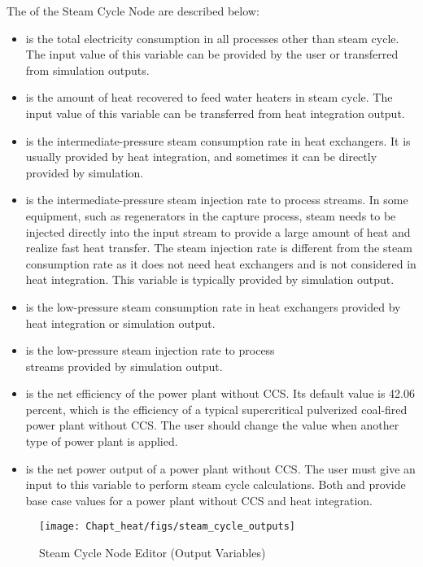 The  of the Steam Cycle Node are described below:
\begin{itemize}
	\item {} is the total electricity consumption in all processes other than steam cycle. The input value of this variable can be provided by the user or transferred from simulation outputs.
	\item {} is the amount of heat recovered to feed water heaters in steam cycle. The input value of this variable can be transferred from heat integration output.
	\item {} is the intermediate-pressure steam consumption rate in heat exchangers. It is usually provided by heat integration, and sometimes it can be directly provided by simulation.
	\item {} is the intermediate-pressure steam injection rate to process streams. In some equipment, such as regenerators in the capture process, steam needs to be injected directly into the input stream to provide a large amount of heat and realize fast heat transfer. The steam injection rate is different from the steam consumption rate as it does not need heat exchangers and is not considered in heat integration. This variable is typically provided by simulation output.
	\item {} is the low-pressure steam consumption rate in heat exchangers provided by heat integration or simulation output.
	\item {} is the low-pressure steam injection rate to process \\streams provided by simulation output.
	\item {} is the net efficiency of the power plant without CCS. Its default value is 42.06 percent, which is the efficiency of a typical supercritical pulverized coal-fired power plant without CCS. The user should change the value when another type of power plant is applied.
	\item {} is the net power output of a power plant without CCS. The user must give an input to this variable to perform steam cycle calculations. Both  and  provide base case values for a power plant without CCS and heat integration.
\end{itemize}

\begin{figure}[H]
	\begin{center}
		\texttt{[image: Chapt\_heat/figs/steam\_cycle\_outputs]}
		\caption{Steam Cycle Node Editor (Output Variables)}
		\label{steam.cycle.outputs}
	\end{center}
\end{figure}

